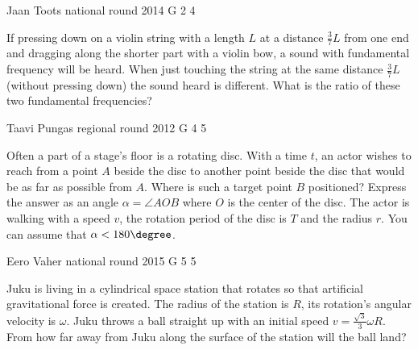 \documentclass[11pt]{article}
\begin{document}
{Jaan Toots} %
{national round} %
{2014} %
{G 2} %
{4} %
{

\ifEngStatement
If pressing down on a violin string with a length $L$ at a distance $\frac{3}{7}L$ from one end and dragging along the shorter part with a violin bow, a sound with fundamental frequency will be heard. When just touching the string at the same distance $\frac{3}{7}L$ (without pressing down) the sound heard is different. What is the ratio of these two fundamental frequencies?
\fi
}

{Taavi Pungas} %
{regional round} %
{2012} %
{G 4} %
{5} %
{

\ifEngStatement
Often a part of a stage’s floor is a rotating disc. With a time $t$, an actor wishes to reach from a point $A$ beside the disc to another point beside the disc that would be as far as possible from $A$.  Where is such a target point $B$ positioned? Express the answer as an angle $\alpha = \angle \mathit{AOB}$ where $O$ is the center of the disc. The actor is walking with a speed $v$, the rotation period of the disc is $T$ and the radius $r$. You can assume that $\alpha < 180\degree$.
\fi
}

{Eero Vaher} %
{national round} %
{2015} %
{G 5} %
{5} %
{

\ifEngStatement
Juku is living in a cylindrical space station that rotates so that artificial gravitational force is created. The radius of the station is $R$, its rotation’s angular velocity is $\omega$. Juku throws a ball straight up with an initial speed $v=\frac{\sqrt{3}}{3}\omega R$. From how far away from Juku along the surface of the station will the ball land?
\fi
}
\end{document}
